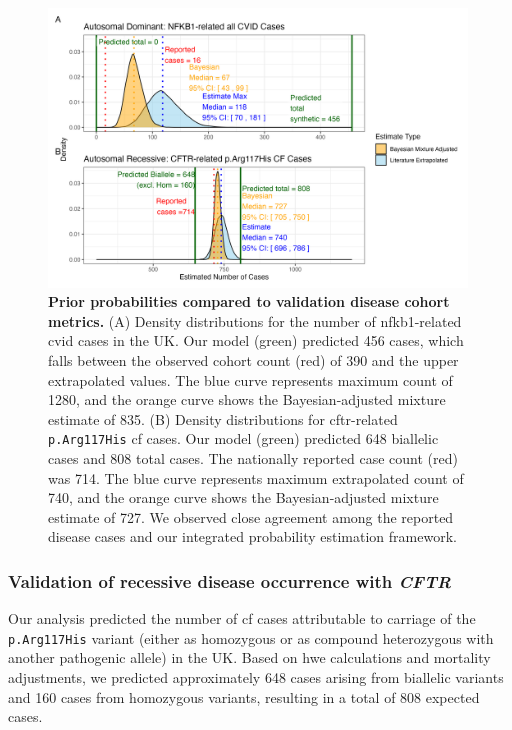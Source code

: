 \begin{figure}[h]
  \centering
  \includegraphics[width=0.99\textwidth]{../images/validation_studies_bayesian_adjusted_estimates.png}
  \caption{\textbf{Prior probabilities compared to validation disease cohort metrics.}
  (A) Density distributions for the number of \ac{nfkb1}-related \ac{cvid} cases in the UK. 
  Our model (green) predicted 456 cases, which falls between the observed cohort count (red) of 390 and the upper extrapolated values.
  The blue curve represents maximum count of 1280, and the orange curve shows the Bayesian-adjusted mixture estimate of 835. 
(B) Density distributions for \ac{cftr}-related \texttt{p.Arg117His} \ac{cf} cases. 
Our model (green) predicted 648 biallelic cases and 808 total cases.
The nationally reported case count (red) was 714.
The blue curve represents maximum extrapolated count of 740, and the orange curve shows the Bayesian-adjusted mixture estimate of 727. We observed close agreement among the reported disease cases and our integrated probability estimation framework.}
  \label{fig:validation_studies_bayesian_adjusted_estimates}
\end{figure}

\subsubsection{Validation of recessive disease occurrence with \textit{CFTR}}

Our analysis predicted the number of \ac{cf} cases attributable to carriage of the \texttt{p.Arg117His} variant (either as homozygous or as compound heterozygous with another pathogenic allele) in the UK. Based on \ac{hwe} calculations and mortality adjustments, we predicted approximately 648 cases arising from biallelic variants and 160 cases from homozygous variants, resulting in a total of 808 expected cases.

